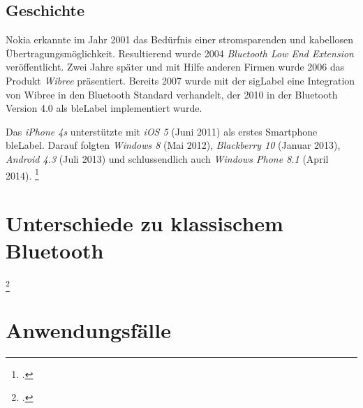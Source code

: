 \subsection{Geschichte}
Nokia erkannte im Jahr 2001 das Bedürfnis einer stromsparenden und kabellosen Übertragungsmöglichkeit. Resultierend wurde 2004 \textit{Bluetooth Low End Extension} veröffentlicht.
Zwei Jahre später und mit Hilfe anderen Firmen wurde 2006 das Produkt \textit{Wibree} präsentiert.
Bereits 2007 wurde mit der \gls{sigLabel} eine Integration von Wibree in den Bluetooth Standard verhandelt, der 2010 in der Bluetooth Version 4.0 als \gls{bleLabel} implementiert wurde.

Das \textit{iPhone 4s} unterstützte mit \textit{iOS 5} (Juni 2011) als erstes Smartphone \gls{bleLabel}.
Darauf folgten \textit{Windows 8} (Mai 2012), \textit{Blackberry 10} (Januar 2013), \textit{Android 4.3} (Juli 2013) und schlussendlich auch \textit{Windows Phone 8.1} (April 2014).
\footcite{Bluetooth_low_energy_Wikipedia_2015-04-17}




\section{Unterschiede zu klassischem Bluetooth}
\footcite{powerconsumption_comparison_2015-04-27}

\section{Anwendungsfälle}


